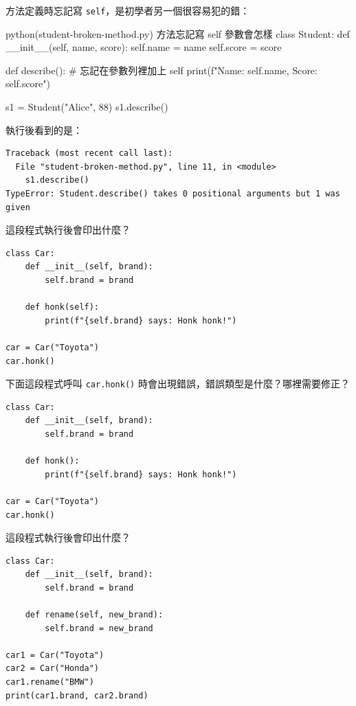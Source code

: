 方法定義時忘記寫 \texttt{self}，是初學者另一個很容易犯的錯：

\begin{example}{python}{(student-broken-method.py) 方法忘記寫 self 參數會怎樣}
class Student:
    def __init__(self, name, score):
        self.name = name
        self.score = score

    def describe():          # 忘記在參數列裡加上 self
        print(f"Name: {self.name}, Score: {self.score}")


s1 = Student("Alice", 88)
s1.describe()
\end{example}

執行後看到的是：

\begin{verbatim}
Traceback (most recent call last):
  File "student-broken-method.py", line 11, in <module>
    s1.describe()
TypeError: Student.describe() takes 0 positional arguments but 1 was given
\end{verbatim}


\begin{drills}[label=drills:methods-and-self]
\item 這段程式執行後會印出什麼？
\begin{verbatim}
class Car:
    def __init__(self, brand):
        self.brand = brand

    def honk(self):
        print(f"{self.brand} says: Honk honk!")

car = Car("Toyota")
car.honk()
\end{verbatim}
\item 下面這段程式呼叫 \texttt{car.honk()} 時會出現錯誤，錯誤類型是什麼？哪裡需要修正？
\begin{verbatim}
class Car:
    def __init__(self, brand):
        self.brand = brand

    def honk():
        print(f"{self.brand} says: Honk honk!")

car = Car("Toyota")
car.honk()
\end{verbatim}
\item 這段程式執行後會印出什麼？
\begin{verbatim}
class Car:
    def __init__(self, brand):
        self.brand = brand

    def rename(self, new_brand):
        self.brand = new_brand

car1 = Car("Toyota")
car2 = Car("Honda")
car1.rename("BMW")
print(car1.brand, car2.brand)
\end{verbatim}
\end{drills}

